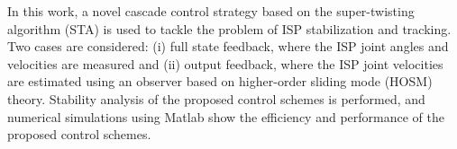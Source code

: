 In this work, a novel cascade control strategy based on the super-twisting algorithm (STA) is used to tackle the problem of ISP stabilization and tracking.
%
Two cases are considered: (i) full state feedback, where the ISP joint angles and velocities are measured and (ii) output feedback, where the ISP joint velocities are estimated using an observer based on higher-order sliding mode (HOSM) theory.
%
Stability analysis of the proposed control schemes is performed, and numerical simulations using Matlab show the efficiency and performance of the proposed control schemes.
